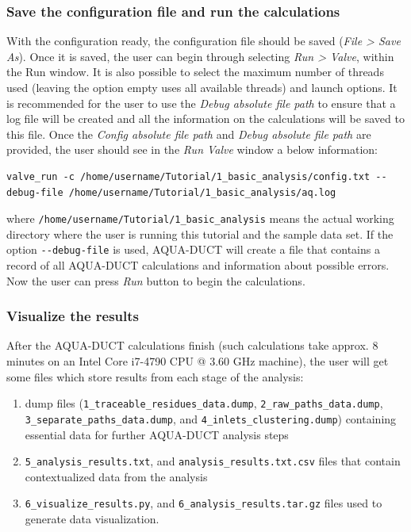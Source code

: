 \documentclass[9pt,tutorial, pubversion]{livecoms}
\begin{document}
\subsubsection{Save the configuration file and run the calculations}
With the configuration ready, the configuration file should be saved (\emph{File > Save As}). Once it is saved, the user can begin through selecting \emph{Run > Valve}, within the Run window. It is also possible to select the maximum number of threads used (leaving the option empty uses all available threads) and launch options. It is recommended for the user to use the \textit{Debug absolute file path} to ensure that a log file will be created and all the information on the calculations will be saved to this file. Once the \textit{Config absolute file path} and \textit{Debug absolute file path} are provided, the user should see in the \textit{Run Valve} window a below information: 
\begin{lstlisting}
valve_run -c /home/username/Tutorial/1_basic_analysis/config.txt --debug-file /home/username/Tutorial/1_basic_analysis/aq.log
\end{lstlisting}
where \texttt{/home/username/Tutorial/1\_basic\_analysis} means the actual working directory where the user is running this tutorial and the sample data set.
If the option \texttt{-{}-debug-file} is used, AQUA-DUCT will create a file that contains a record of all AQUA-DUCT calculations and information about possible errors. 
Now the user can press \textit{Run} button to begin the calculations. 

\subsubsection{Visualize the results}
After the AQUA-DUCT calculations finish (such calculations take approx. 8 minutes on an Intel Core i7-4790 CPU @ 3.60 GHz machine), the user will get some files which store results from each stage of the analysis:

\begin{enumerate}
    \item dump files (\texttt{1\_traceable\_residues\_data.dump}, \texttt{2\_raw\_paths\_data.dump}, \texttt{3\_separate\_paths\_data.dump}, and \texttt{4\_inlets\_clustering.dump}) containing essential data for further AQUA-DUCT analysis steps
    \item \texttt{5\_analysis\_results.txt}, \hfill and \newline \texttt{analysis\_results.txt.csv} files that contain contextualized data from the analysis
    \item \texttt{6\_visualize\_results.py}, \hfill and \newline \texttt{6\_analysis\_results.tar.gz} files used to generate data visualization.
\end{enumerate}
\end{document}
